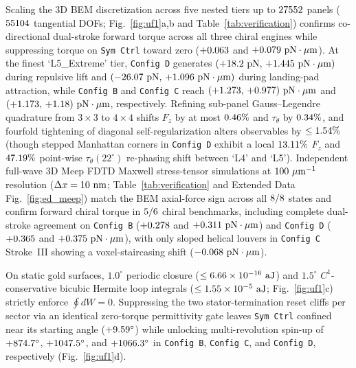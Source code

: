 \documentclass[11pt,a4paper]{article}
\begin{document}
Scaling the 3D BEM discretization across five nested tiers up to $27552{}$ panels ($55104{}$ tangential DOFs; Fig.~\ref{fig:uf1}a,b and Table~\ref{tab:verification}) confirms co-directional dual-stroke forward torque across all three chiral engines while suppressing torque on \texttt{Sym Ctrl} toward zero ($+0.063{}$ and $+0.079{}\text{ pN}\cdot\mu\text{m}$). At the finest `L5\_Extreme' tier, \texttt{Config D} generates $(+18.2{}\text{ pN},\,+1.445{}\text{ pN}\cdot\mu\text{m})$ during repulsive lift and $(-26.07{}\text{ pN},\,+1.096{}\text{ pN}\cdot\mu\text{m})$ during landing-pad attraction, while \texttt{Config B} and \texttt{Config C} reach $(+1.273{},\,+0.977{})\text{ pN}\cdot\mu\text{m}$ and $(+1.173{},\,+1.18{})\text{ pN}\cdot\mu\text{m}$, respectively. Refining sub-panel Gauss--Legendre quadrature from $3\times 3$ to $4\times 4$ shifts $F_z$ by at most $0.46{}\%$ and $\tau_\theta$ by $0.34{}\%$, and fourfold tightening of diagonal self-regularization alters observables by $\le 1.54{}\%$ (though stepped Manhattan corners in \texttt{Config D} exhibit a local $13.11{}\%$ $F_z$ and $47.19{}\%$ point-wise $\tau_\theta(22^\circ)$ re-phasing shift between `L4' and `L5'). Independent full-wave 3D Meep FDTD Maxwell stress-tensor simulations\cite{rodriguez2009fdtd,oskooi2010meep} at $100{}\ \mu\text{m}^{-1}$ resolution ($\Delta x = 10{}\text{ nm}$; Table~\ref{tab:verification} and Extended Data Fig.~\ref{fig:ed_meep}) match the BEM axial-force sign across all $8{}/8{}$ states and confirm forward chiral torque in $5{}/6{}$ chiral benchmarks, including complete dual-stroke agreement on \texttt{Config B} ($+0.278{}$ and $+0.311{}\text{ pN}\cdot\mu\text{m}$) and \texttt{Config D} ($+0.365{}$ and $+0.375{}\text{ pN}\cdot\mu\text{m}$), with only sloped helical louvers in \texttt{Config C} Stroke~III showing a voxel-staircasing shift ($-0.068{}\text{ pN}\cdot\mu\text{m}$).

On static gold surfaces, $1.0^\circ$ periodic closure ($\le 6.66 \times 10^{-16}{}\text{ aJ}$) and $1.5^\circ$ $C^1$-conservative bicubic Hermite loop integrals ($\le 1.55 \times 10^{-5}{}\text{ aJ}$; Fig.~\ref{fig:uf1}c) strictly enforce $\oint dW = 0$. Suppressing the two stator-termination reset cliffs per sector via an identical zero-torque permittivity gate leaves \texttt{Sym Ctrl} confined near its starting angle ($+9.59{}^\circ$) while unlocking multi-revolution spin-up of $+874.7{}^\circ$, $+1047.5{}^\circ$, and $+1066.3{}^\circ$ in \texttt{Config B}, \texttt{Config C}, and \texttt{Config D}, respectively (Fig.~\ref{fig:uf1}d).
\end{document}
